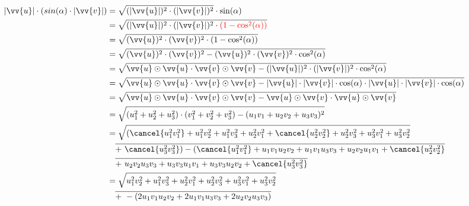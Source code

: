 \documentclass[main.tex]{subfiles}
\begin{document}
    \begin{Beweis}
        \begin{align*}
            |\vv{u}| \cdot (sin(\alpha) \cdot |\vv{v}|) &= \sqrt{(|\vv{u}|)^2 \cdot (|\vv{v}|)^2} \cdot \sin(\alpha) \\
                                                        &= \sqrt{(|\vv{u}|)^2 \cdot (|\vv{v}|)^2 \cdot \textcolor{red}{(1 - \cos^2(\alpha))}} \\
                                                        &= \sqrt{(\vv{u})^2 \cdot (\vv{v})^2 \cdot (1 - \cos^2(\alpha))} \\
                                                        &= \sqrt{(\vv{u})^2 \cdot (\vv{v})^2 - (\vv{u})^2 \cdot (\vv{v})^2 \cdot \cos^2(\alpha)} \\
                                                        &= \sqrt{\vv{u} \odot \vv{u} \cdot \vv{v} \odot \vv{v} - (|\vv{u}|)^2 \cdot (|\vv{v}|)^2 \cdot \cos^2(\alpha)} \\
                                                        &= \sqrt{\vv{u} \odot \vv{u} \cdot \vv{v} \odot \vv{v} - |\vv{u}| \cdot |\vv{v}| \cdot \cos(\alpha) \cdot |\vv{u}| \cdot |\vv{v}| \cdot \cos(\alpha)} \\
                                                        &= \sqrt{\vv{u} \odot \vv{u} \cdot \vv{v} \odot \vv{v} - \vv{u} \odot \vv{v} \cdot \vv{u} \odot \vv{v}} \\
                                                        &= \sqrt{(u_1^2 + u_2^2 + u_3^2) \cdot (v_1^2 + v_2^2 + v_3^2) - (u_1v_1 + u_2v_2 + u_3v_3)^2} \\
                                                        &= \sqrt{(\cancel{u_1^2v_1^2} + u_1^2v_2^2 + u_1^2v_3^2 + u_2^2v_1^2 + \cancel{u_2^2v_2^2} + u_2^2v_3^2 + u_3^2v_1^2 + u_3^2v_2^2} \\
                                                        & \quad \overline{+\text{ }\cancel{u_3^2v_3^2}) - (\cancel{u_1^2v_1^2} + u_1v_1u_2v_2 + u_1v_1u_3v_3 + u_2v_2u_1v_1 + \cancel{u_2^2v_2^2}} \\
                                                        & \quad \overline{+\text{ }u_2v_2u_3v_3 + u_3v_3u_1v_1 + u_3v_3u_2v_2 + \cancel{u_3^2v_3^2}} \\
                                                        &= \sqrt{u_1^2v_2^2 + u_1^2v_3^2 + u_2^2v_1^2 + u_2^2v_3^2 + u_3^2v_1^2 + u_3^2v_2^2} \\
                                                        & \quad \overline{+\text{ } - (2u_1v_1u_2v_2 + 2u_1v_1u_3v_3 + 2u_2v_2u_3v_3)} \\

\end{align*}
\end{Beweis}
\end{document}
